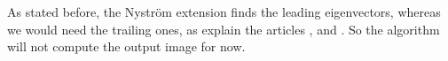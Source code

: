 As stated before, the Nystr\"om extension finds the leading eigenvectors, whereas we would need the trailing ones, as explain the articles \cite{belongie_spectral_2002}, \cite{fowlkes_spectral_2004} and \cite{glide_2014}.
So the algorithm will not compute the output image for now.
